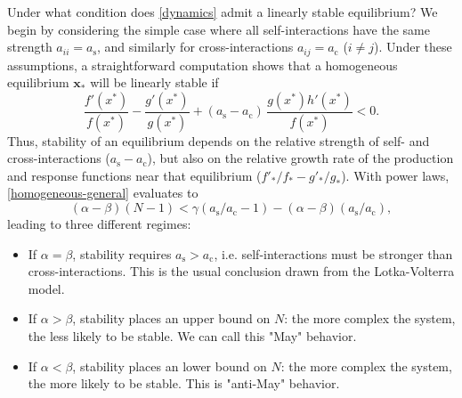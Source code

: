 
Under what condition does \eqref{dynamics} admit a linearly stable equilibrium? 
We begin by considering the simple case where all self-interactions have the same strength $a_{ii} = a_{\textrm{s}}$, and similarly for cross-interactions $a_{ij} = a_{\textrm{c}}$ ($i\neq j$).
Under these assumptions, a straightforward computation shows that a homogeneous equilibrium $\mathbf x_*$ will be linearly stable if  
\begin{equation}\label{homogeneous-general}
   \frac{f'(x^*)}{f(x^*)} - \frac{g'(x^*)}{g(x^*)} + (a_{\textrm{s}} - a_{\textrm{c}})\,\frac{g(x^*)h'(x^*)}{f(x^*)} < 0.
\end{equation}
Thus, stability of an equilibrium depends on the relative strength of self- and cross-interactions ($a_{\textrm{s}} - a_{\textrm{c}}$), but also on the relative growth rate of the production and response functions near that equilibrium ($f'_*/f_* - g'_*/g_*$).
With power laws, \eqref{homogeneous-general} evaluates to 
\begin{equation}
    (\alpha - \beta)(N-1) < \gamma(a_{\textrm{s}}/a_{\textrm{c}}- 1) - (\alpha - \beta)(a_{\textrm{s}}/a_{\textrm{c}}),
\end{equation}
leading to three different regimes:
\begin{itemize}
    \item If $\alpha = \beta$, stability requires $a_{\textrm{s}} > a_{\textrm{c}}$, i.e.
    self-interactions must be stronger than cross-interactions.
    This is the usual conclusion drawn from the Lotka-Volterra model.
    \item If $\alpha > \beta$, stability places an upper bound on $N$: the more complex the system, the less likely to be stable.
    We can call this "May" behavior.
    \item If $\alpha < \beta$, stability places an lower bound on $N$: the more complex the system, the more likely to be stable.
    This is "anti-May" behavior.
\end{itemize}

